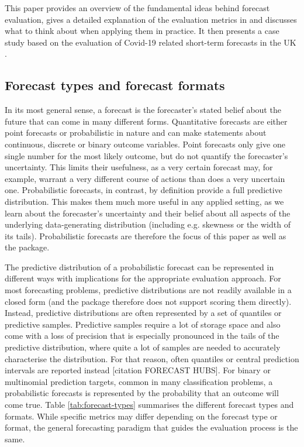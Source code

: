 \documentclass[article,shortnames]{jss}
\begin{document}
This paper provides an overview of the fundamental ideas behind forecast evaluation, gives a detailed explanation of the evaluation metrics in  and discusses what to think about when applying them in practice. It then presents a case study based on the evaluation of Covid-19 related short-term forecasts in the UK \citep{funkShorttermForecastsInform2020}. 
\subsection{Forecast types and forecast formats}

In its most general sense, a forecast is the forecaster’s stated belief about the future \citep{gneitingStrictlyProperScoring2007} that can come in many different forms. Quantitative forecasts are either point forecasts or probabilistic in nature and can make statements about continuous, discrete or binary outcome variables. Point forecasts only give one single number for the most likely outcome, but do not quantify the forecaster's uncertainty. This limits their usefulness, as a very certain forecast may, for example, warrant a very different course of actions than does a very uncertain one. Probabilistic forecasts, in contrast, by definition provide a full predictive distribution. This makes them much more useful in any applied setting, as we learn about the forecaster's uncertainty and their belief about all aspects of the underlying data-generating distribution (including e.g. skewness or the width of its tails). Probabilistic forecasts are therefore the focus of this paper as well as the  package. 

The predictive distribution of a probabilistic forecast can be represented in different ways with implications for the appropriate evaluation approach. For most forecasting problems, predictive distributions are not readily available in a closed form (and the  package therefore does not support scoring them directly). Instead, predictive distributions are often represented by a set of quantiles or predictive samples. Predictive samples require a lot of storage space and also come with a loss of precision that is especially pronounced in the tails of the predictive distribution, where quite a lot of samples are needed to accurately characterise the distribution. For that reason, often quantiles or central prediction intervals are reported instead [citation FORECAST HUBS]. For binary or multinomial prediction targets, common in many classification problems, a probabilistic forecasts is represented by the probability that an outcome will come true. Table \ref{tab:forecast-types} summarises the different forecast types and formats. While specific metrics may differ depending on the forecast type or format, the general forecasting paradigm \cite{gneitingProbabilisticForecastsCalibration2007} that guides the evaluation process is the same.
\end{document}
